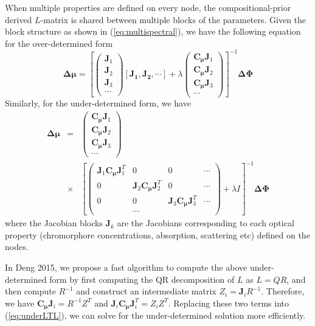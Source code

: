 \documentclass{article}
\begin{document}
When multiple properties are defined on every node, the compositional-prior derived $L$-matrix is shared between multiple blocks of the parameters. Given the block structure as shown in (\ref{eq:multispectral}), we have the following equation for the over-determined form
\begin{equation}
\mathbf{\Delta\mu}=
\left[\left(\begin{array}{l}
\mathbf{J}_1\\
\mathbf{J}_2\\
\mathbf{J}_3\\
\cdots 
\end{array}\right)
[\mathbf{J_1, J_2},\cdots]+\lambda
\left(\begin{array}{l}
\mathbf{C_\mu}\mathbf{J}_1\\
\mathbf{C_\mu}\mathbf{J}_2\\
\mathbf{C_\mu}\mathbf{J}_3\\
\cdots 
\end{array}\right)\right]^{-1}\mathbf{\Delta\Phi}
\end{equation}
Similarly, for the under-determined form, we have
\begin{eqnarray}\label{eq:underLTL}
\mathbf{\Delta\mu}&=&
\left(\begin{array}{l}
\mathbf{C_\mu}\mathbf{J}_1\\
\mathbf{C_\mu}\mathbf{J}_2\\
\mathbf{C_\mu}\mathbf{J}_3\\
\cdots 
\end{array}\right)\\
&\times& \left[
\left(\begin{array}{cccc}
\mathbf{J}_1\mathbf{C_\mu}\mathbf{J}^T_1 & 0 & 0 & \cdots\\
0& \mathbf{J}_2\mathbf{C_\mu}\mathbf{J}^T_2 & 0 & \cdots\\
0 & 0 & \mathbf{J}_3\mathbf{C_\mu}\mathbf{J}^T_3 & \cdots\\
& \cdots& 
\end{array}\right)
+\lambda I\right]^{-1}\mathbf{\Delta\Phi}
\end{eqnarray}
where the Jacobian blocks $\mathbf{J}_k$ are the Jacobians corresponding to each optical property (chromorphore concentrations, absorption, scattering etc) defined on the nodes.

In Deng 2015, we propose a fast algorithm to compute the above under-determined form by first computing the QR decomposition of $L$ as $L=QR$, and then compute $R^{-1}$ and construct an intermediate matrix $Z_i=\mathbf{J}_iR^{-1}$. Therefore, we have $\mathbf{C_\mu}\mathbf{J}_i=R^{-1}Z^T$ and $\mathbf{J}_i\mathbf{C_\mu}\mathbf{J}^T_i=Z_iZ^T$. 
Replacing these two terms into (\ref{eq:underLTL}), we can solve for the under-determined solution more efficiently.
\end{document}
